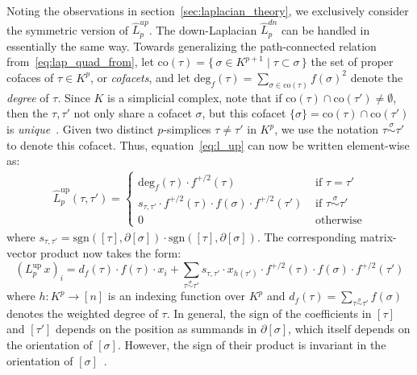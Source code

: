 \documentclass[12pt]{article}
\numberwithin{equation}{section}
\newcommand{\+}{%
	\raisebox{0.18ex}{\scaleobj{0.55}{+}}
}
\theoremstyle{definition}
\begin{document}
Noting the observations in section~\ref{sec:laplacian_theory}, we exclusively consider the symmetric version of $\hat{L}_p^{up}$. The down-Laplacian $\hat{L}_p^{dn}$ can be handled in essentially the same way. 
Towards generalizing the path-connected relation from~\eqref{eq:lap_quad_from}, let $\mathrm{co}(\tau) = \{ \, \sigma \in K^{p+1} \mid \tau \subset \sigma \, \}$ the set of proper cofaces of $\tau \in K^p$, or \emph{cofacets}, and let $\mathrm{deg}_f(\tau) = \sum_{\sigma \in \mathrm{co}(\tau)} f(\sigma)^2$ denote the \emph{degree} of $\tau$.
Since $K$ is a simplicial complex, note that if $\mathrm{co}(\tau) \cap \mathrm{co}(\tau') \neq \emptyset$, then the $\tau, \tau'$ not only share a cofacet $\sigma$, but this cofacet $\{\sigma\} = \mathrm{co}(\tau) \cap \mathrm{co}(\tau')$ is \emph{unique}~\cite{}. 
Given two distinct $p$-simplices $\tau \neq \tau'$ in $K^p$, we use the notation $\tau \overset{\sigma}{\sim} \tau'$ to denote this cofacet. Thus, equation~\eqref{eq:l_up} can now be written element-wise as: 
\begin{align}\label{eq:up_laplace_theory}
	 \hat{L}_p^{\text{up}}(\tau, \tau')= \begin{cases}
		 \mathrm{deg}_f(\tau) \cdot f^{+/2}(\tau) & \text{ if } \tau = \tau' \\ 
		s_{\tau, \tau'} \cdot  f^{+/2}(\tau) \cdot f(\sigma) \cdot f^{+/2}(\tau') & \text{ if } \tau \overset{\sigma}{\sim} \tau' \\
		0 & \text{ otherwise} 
	\end{cases}
\end{align}
where $s_{\tau, \tau'} = \mathrm{sgn}([\tau], \partial[\sigma]) \cdot \mathrm{sgn}([\tau], \partial[\sigma])$.
The corresponding matrix-vector product now takes the form: 
\begin{equation}\label{eq:l_up_matvec}
	(L_p^{\textrm{up}} \, x)_i =  d_f(\tau) \cdot f(\tau) \cdot x_i + \sum\limits_{\tau \overset{\sigma}{\sim} \tau'} s_{\tau, \tau'} \cdot x_{h(\tau')} \cdot  f^{+/2}(\tau) \cdot f(\sigma) \cdot f^{+/2}(\tau') 
\end{equation}
where $h : K^p \to [n]$ is an indexing function over $K^p$ and $d_f(\tau) = \sum_{\tau \overset{\sigma}{\sim} \tau'} f(\sigma) $ denotes the weighted degree of $\tau$. 
In general, the sign of the coefficients in $[\tau]$ and $[\tau']$ depends on the position as summands in $\partial[\sigma]$, which itself depends on the orientation of $[\sigma]$. However, the sign of their product is invariant in the orientation of $[\sigma]$~\cite{}. 
\end{document}
